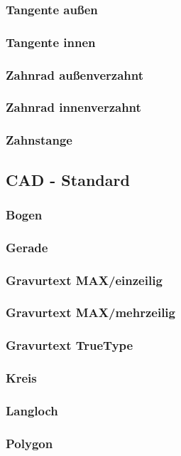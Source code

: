 \documentclass[a5paper]{book}
\begin{document}
			\subsubsection{Tangente außen}
			\subsubsection{Tangente innen}
			\subsubsection{Zahnrad außenverzahnt}
			\subsubsection{Zahnrad innenverzahnt}
			\subsubsection{Zahnstange}
		\subsection{CAD - Standard}
			\subsubsection{Bogen} 
			\subsubsection{Gerade}
			\subsubsection{Gravurtext MAX/einzeilig} 
			\subsubsection{Gravurtext MAX/mehrzeilig}
			\subsubsection{Gravurtext TrueType} 
			\subsubsection{Kreis} 
			\subsubsection{Langloch} 
			\subsubsection{Polygon} 
\end{document}
